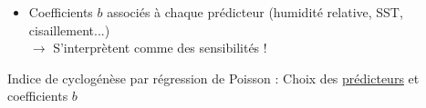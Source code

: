 \documentclass[aspectratio=169, usepdftitle=false, xcolor={dvipsnames}, 9pt,table]{beamer}
\begin{document}
\begin{frame}[c]
\begin{definition}
\begin{itemize}
            \item Coefficients $b$ associés à chaque prédicteur (humidité relative, SST, cisaillement...)\\
                $\longrightarrow$ S'interprètent comme des \alert{sensibilités} !
        \end{itemize} 
    \end{definition}
    \vspace{1em}
    \begin{center}
        \small
        Indice de cyclogénèse par régression de Poisson : Choix des \underline{\alert{prédicteurs}} et \alert{coefficients} $b$
    \end{center}
\end{frame}

\end{document}
